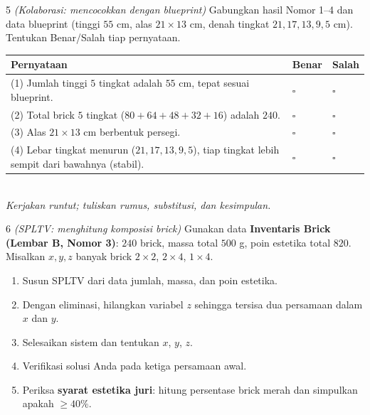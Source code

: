 \documentclass[11pt]{article}
\makeatletter
\newenvironment{bstabel}{%
  \par\smallskip\begin{center}\renewcommand{\arraystretch}{1.35}%
  \begin{tabular}{@{}p{0.72\textwidth}>{\centering\arraybackslash}m{1.5cm}>{\centering\arraybackslash}m{1.5cm}@{}}
  \toprule
  \textbf{Pernyataan} & \textbf{Benar} & \textbf{Salah}\\\midrule}%
  {\bottomrule\end{tabular}\end{center}}
\newcommand{\bs}[1]{#1 & $\square$ & $\square$\\[1pt]}
\newenvironment{subsoal}{%
  \begin{enumerate}[label=\textbf{(\alph*)},leftmargin=1.8em,itemsep=5pt,topsep=3pt]}%
  {\end{enumerate}}
\makeatother
\begin{document}
\begin{soal}{5 \normalfont\itshape(Kolaborasi: mencocokkan dengan blueprint)}
Gabungkan hasil Nomor 1--4 dan data blueprint (tinggi $55$ cm, alas $21\times13$
cm, denah tingkat $21,17,13,9,5$ cm). Tentukan Benar/Salah tiap pernyataan.
\begin{bstabel}
  \bs{(1) Jumlah tinggi $5$ tingkat adalah $55$ cm, tepat sesuai blueprint.}
  \bs{(2) Total brick $5$ tingkat ($80{+}64{+}48{+}32{+}16$) adalah $240$.}
  \bs{(3) Alas $21\times13$ cm berbentuk persegi.}
  \bs{(4) Lebar tingkat menurun ($21,17,13,9,5$), tiap tingkat lebih sempit dari bawahnya (stabil).}
\end{bstabel}
\end{soal}

\clearpage
{}\\[0.2em]
\small\emph{Kerjakan runtut; tuliskan rumus, substitusi, dan kesimpulan.}\normalsize

\bigskip

\begin{soal}{6 \normalfont\itshape(SPLTV: menghitung komposisi brick)}
Gunakan data \textbf{Inventaris Brick (Lembar B, Nomor 3)}: $240$ brick, massa
total $500$ g, poin estetika total $820$. Misalkan $x,y,z$ banyak brick $2\times2$,
$2\times4$, $1\times4$.

\begin{subsoal}
  \item Susun SPLTV dari data jumlah, massa, dan poin estetika.
  \item Dengan eliminasi, hilangkan variabel $z$ sehingga tersisa dua persamaan
        dalam $x$ dan $y$.
  \item Selesaikan sistem dan tentukan $x$, $y$, $z$.
  \item Verifikasi solusi Anda pada ketiga persamaan awal.
  \item Periksa \textbf{syarat estetika juri}: hitung persentase brick merah dan
        simpulkan apakah $\ge40\%$.
\end{subsoal}
\end{soal}
\end{document}
